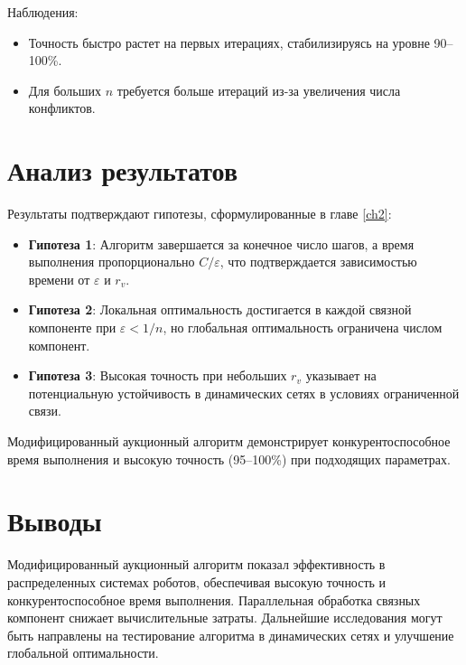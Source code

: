 Наблюдения:
\begin{itemize}
    \item Точность быстро растет на первых итерациях, стабилизируясь на уровне 90--100\%.
    \item Для больших \( n \) требуется больше итераций из-за увеличения числа конфликтов.
\end{itemize}

\section{Анализ результатов}

Результаты подтверждают гипотезы, сформулированные в главе \ref{ch2}:

\begin{itemize}
    \item \textbf{Гипотеза 1}: Алгоритм завершается за конечное число шагов, а время выполнения пропорционально \( C / \varepsilon \), что подтверждается зависимостью времени от \( \varepsilon \) и \( r_v \).
    \item \textbf{Гипотеза 2}: Локальная оптимальность достигается в каждой связной компоненте при \( \varepsilon < 1/n \), но глобальная оптимальность ограничена числом компонент.
    \item \textbf{Гипотеза 3}: Высокая точность при небольших \( r_v \) указывает на потенциальную устойчивость в динамических сетях в условиях ограниченной связи.
\end{itemize}

Модифицированный аукционный алгоритм демонстрирует конкурентоспособное время выполнения и высокую точность (95--100\%) при подходящих параметрах.



\section{Выводы}

Модифицированный аукционный алгоритм показал эффективность в распределенных системах роботов, обеспечивая высокую точность и конкурентоспособное время выполнения. Параллельная обработка связных компонент снижает вычислительные затраты. Дальнейшие исследования могут быть направлены на тестирование алгоритма в динамических сетях и улучшение глобальной оптимальности.